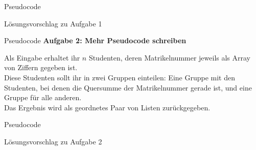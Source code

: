 
\begin{frame}{Pseudocode}
	\begin{exampleblock}{Lösungsvorschlag zu Aufgabe 1}
		\begin{algorithm}[H]
		\end{algorithm}
	\end{exampleblock}
\end{frame}


\begin{frame}{Pseudocode}
	\textbf{Aufgabe 2: Mehr Pseudocode schreiben} \\
	\medskip
	
	Als Eingabe erhaltet ihr $n$ Studenten, deren Matrikelnummer jeweils als Array von Ziffern gegeben ist.\\
	Diese Studenten sollt ihr in zwei Gruppen einteilen: Eine Gruppe mit den Studenten, bei denen die  Quersumme der Matrikelnummer gerade ist, und eine Gruppe für alle anderen.\\
	Das Ergebnis wird als geordnetes Paar von Listen zurückgegeben.
\end{frame}

\begin{frame}{Pseudocode}
	\begin{exampleblock}{Lösungsvorschlag zu Aufgabe 2}
		\begin{algorithm}[H]
		\end{algorithm}
	\end{exampleblock}
\end{frame}


